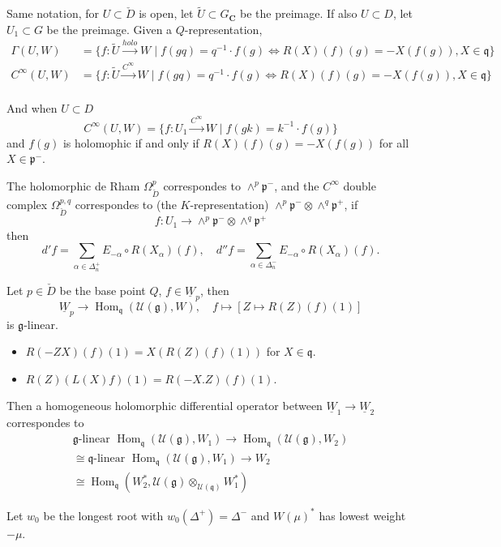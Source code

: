 \documentclass[leqno]{amsart}
\newcommand{\C}{\mathbf C}
\newcommand{\1}{\mathbf{1}}
\newcommand{\cfg}{\mathfrak{g}}
\newcommand{\cfp}{\mathfrak{p}}
\newcommand{\cfq}{\mathfrak{q}}
\DeclareMathOperator{\Hom}{Hom}
\theoremstyle{definition}
\theoremstyle{remark}
\begin{document}
Same notation,
for $U\subset \check{D}$ is open,
let $ \tilde{U}\subset G_\C$ be the preimage.
If also $U\subset D$,
let $ U_1\subset G$ be the preimage.
Given a $Q$-representation,
 \begin{align*}
	 \Gamma(U,W)&=
	 \{
	 f\colon \tilde{U}\xrightarrow{holo}W\mid
	 f(gq)=q^{-1}\cdot f(g)\Longleftrightarrow
	 R(X)(f)(g)=-X(f(g)), X\in \cfq
	 \}\\
	 C^\infty(U,W)&=
	 \{
	 f\colon \tilde{U}\xrightarrow{C^\infty}W\mid
	 f(gq)=q^{-1}\cdot f(g)\Longleftrightarrow
	 R(X)(f)(g)=-X(f(g)), X\in \cfq
	 \}\\
\end{align*}

And when $U\subset D$
 \[
	 C^\infty(U,W)=
	 \{
	 f\colon U_1\xrightarrow{C^\infty}W\mid
	 f(gk)=k^{-1}\cdot f(g)
	 \}
\]
and $f(g)$ is holomophic if and only if
$R(X)(f)(g)=-X(f(g))$ for all  $X\in \cfp^-$.

The holomorphic de Rham
$\Omega^p_{\check{D}}$
correspondes to $\wedge^p\cfp^-$,
and  the  $C^\infty$ double complex
$\Omega^{p,q}_{\check{D}}$ 
correspondes to (the $K$-representation)
 $\wedge^p\cfp^-\otimes\wedge^q\cfp^+$,
if
 \[
	f\colon U_1\to 
	\wedge^p\cfp^-\otimes\wedge^q\cfp^+
\]
then
\[
	d'f=\sum_{\alpha\in\Delta_n^+}
	E_{-\alpha}\circ R(X_\alpha)(f),\quad
	d''f=\sum_{\alpha\in\Delta_n^-}
	E_{-\alpha}\circ R(X_\alpha)(f).
\]

Let $p\in \check{D}$ be the base point $Q$,
$f\in \underline{W}_p$,
then
\[
	\underline{W}_p\to
	\Hom_\cfq(\mathcal{U}(\cfg),W),\quad
	f\mapsto 
	[Z\mapsto R(Z)(f)(1)]
\]
is $\cfg$-linear.
 \begin{itemize}
	 \item $R(-ZX)(f)(1)=X(R(Z)(f)(1))$
		 for  $X\in\cfq$.
	 \item $R(Z)(L(X)f)(1)=R(-X.Z)(f)(1)$.
\end{itemize}
Then a homogeneous holomorphic differential 
operator between
$\underline{W}_1\to \underline{W}_2$
correspondes to 
 \begin{multline*}
 	\cfg\text{-linear }
	\Hom_\cfq(\mathcal{U}(\cfg),W_1)\to
	\Hom_\cfq(\mathcal{U}(\cfg),W_2)\\
	\cong 
	\cfq\text{-linear }
	\Hom_\cfq(\mathcal{U}(\cfg),W_1)\to
	W_2\\
	\cong 
	\Hom_\cfq(
	W_2^*,
	\mathcal{U}(\cfg)
	\otimes_{\mathcal{U}(\cfq)}W_1^*)
 \end{multline*}

Let $w_0$ be the longest root 
with  $w_0(\Delta^+)=\Delta^-$
and  $W(\mu)^*$ 
has lowest weight  $-\mu$.
\end{document}
